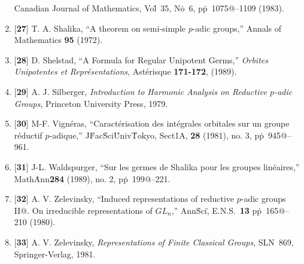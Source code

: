 \documentclass{amsart}
\begin{document}
\begin{enumerate}
  Canadian Journal of Mathematics, Vol\.~35, No\.~6,
  pp\.~1075@--1109 (1983).
%
\item{[{\bf 27}]}
  T. A. Shalika,
  ``A theorem on semi-simple $p$-adic groups,''
  Annals of Mathematics {\bf 95} (1972).
%
\item{[{\bf 28}]}
  D. Shelstad,
  ``A Formula for Regular Unipotent Germs,''
  {\sl Orbites Unipotentes et Repr\'esentations},
  Ast\'erisque {\bf 171-172}, (1989).
%
\item{[{\bf 29}]}
  A. J. Silberger,
  {\sl Introduction to Harmonic Analysis on Reductive $p$-adic Groups},
  Princeton University Press, 1979.
%
\item{[{\bf 30}]}
  M-F. Vign\'eras,
  ``Caract\'erisation des int\'egrales orbitales sur un
     groupe r\'eductif $p$-adique,''
     J\. Fac\. Sci\. Univ\. Tokyo,
     Sect\. 1A,
     {\bf 28} (1981), no. 3, pp\.~945@--961.
%
\item{[{\bf 31}]}
  J-L. Waldspurger,
  ``Sur les germes de Shalika pour les groupes lin\'eaires,''
  Math\. Ann\. {\bf 284} (1989), no. 2, pp\.~199@--221.
%
\item{[{\bf 32}]}
  A. V. Zelevinsky,
  ``Induced representations of reductive $p$-adic groups II@.
     On irreducible representations of $GL_n$,''
  Ann\. Sci\., E.N.S.~{\bf 13}
  pp\.~165@--210 (1980).
%
\item{[{\bf 33}]}
  A. V. Zelevinsky,
  {\sl Representations of Finite Classical Groups},
  SLN~869, Springer-Verlag, 1981.
\end{enumerate}
\end{document}
